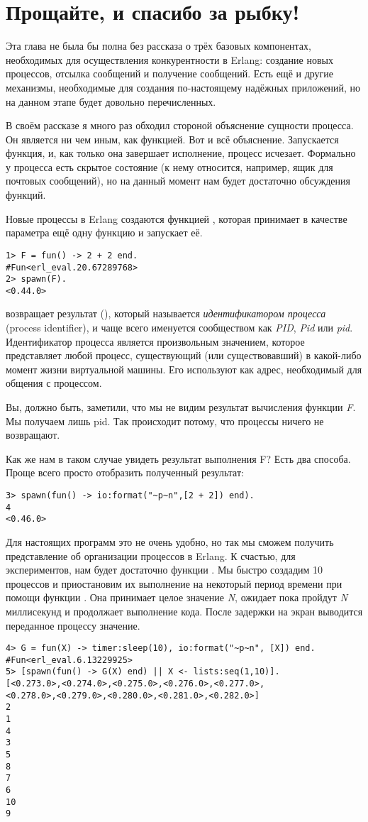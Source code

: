 \section{Прощайте, и спасибо за рыбку!}
Эта глава не была бы полна без рассказа о трёх базовых компонентах, необходимых для осуществления конкурентности в Erlang: создание новых процессов, отсылка сообщений и получение сообщений.
Есть ещё и другие механизмы, необходимые для создания по\--настоящему надёжных приложений, но на данном этапе будет довольно перечисленных.

В своём рассказе я много раз обходил стороной объяснение сущности процесса.
Он является ни чем иным, как функцией.
Вот и всё объяснение.
Запускается функция, и, как только она завершает исполнение, процесс исчезает.
Формально у процесса есть скрытое состояние (к нему относится, например, ящик для почтовых сообщений), но на данный момент нам будет достаточно обсуждения функций.

Новые процессы в Erlang создаются функцией , которая принимает в качестве параметра ещё одну функцию и запускает её.
\begin{lstlisting}[style=erlang]
1> F = fun() -> 2 + 2 end.
#Fun<erl_eval.20.67289768>
2> spawn(F).
<0.44.0>
\end{lstlisting}

 возвращает результат (), который называется \emph{идентификатором процесса} (process identifier), и чаще всего именуется сообществом как \emph{PID}, \emph{Pid} или \emph{pid}.
Идентификатор процесса является произвольным значением, которое представляет любой процесс, существующий (или существовавший) в какой\--либо момент жизни виртуальной машины.
Его используют как адрес, необходимый для общения с процессом.

Вы, должно быть, заметили, что мы не видим результат вычисления функции \emph{F}.
Мы получаем лишь pid.
Так происходит потому, что процессы ничего не возвращают.

Как же нам в таком случае увидеть результат выполнения F?
Есть два способа.
Проще всего просто отобразить полученный результат:
\begin{lstlisting}[style=erlang]
3> spawn(fun() -> io:format("~p~n",[2 + 2]) end).
4
<0.46.0>
\end{lstlisting}

Для настоящих программ это не очень удобно, но так мы сможем получить представление об организации процессов в Erlang.
К счастью, для экспериментов, нам будет достаточно функции .
Мы быстро создадим 10 процессов и приостановим их выполнение на некоторый период времени при помощи функции .
Она  принимает целое значение \emph{N}, ожидает пока пройдут \emph{N} миллисекунд и продолжает выполнение кода.
После задержки на экран выводится переданное процессу значение.
\begin{lstlisting}[style=erlang]
4> G = fun(X) -> timer:sleep(10), io:format("~p~n", [X]) end.
#Fun<erl_eval.6.13229925>
5> [spawn(fun() -> G(X) end) || X <- lists:seq(1,10)].
[<0.273.0>,<0.274.0>,<0.275.0>,<0.276.0>,<0.277.0>,
<0.278.0>,<0.279.0>,<0.280.0>,<0.281.0>,<0.282.0>]
2  
1  
4  
3  
5  
8  
7  
6  
10 
9 
\end{lstlisting}

